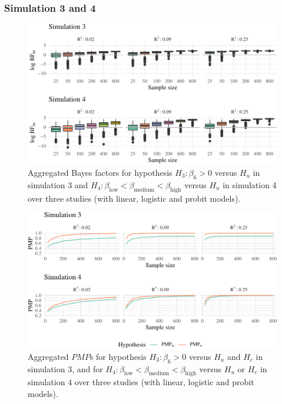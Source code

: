 \documentclass[review, 3p, authoryear]{elsarticle} %
\begin{document}
\hypertarget{simulation-3-and-4}{%
\subsubsection{Simulation 3 and 4}\label{simulation-3-and-4}}

\begin{figure}
\includegraphics[width=1\linewidth]{manuscript_volker_files/figure-latex/BF34-1} \caption{Aggregated Bayes factors for hypothesis $H_3: \beta_6 > 0$ versus $H_u$ in simulation 3 and $H_4: \beta_{\text{low}} < \beta_{\text{medium}} < \beta_{\text{high}}$ versus $H_u$ in simulation 4 over three studies (with linear, logistic and probit models).}\label{fig:BF34}
\end{figure}

\begin{figure}
\includegraphics[width=1\linewidth]{manuscript_volker_files/figure-latex/PMP34-1} \caption{Aggregated $PMP$s for hypothesis $H_3: \beta_6 > 0$ versus $H_u$ and $H_c$ in simulation 3, and for $H_4: \beta_{\text{low}} < \beta_{\text{medium}} < \beta_{\text{high}}$ versus $H_u$ or $H_c$ in simulation 4 over three studies (with linear, logistic and probit models).}\label{fig:PMP34}
\end{figure}
\end{document}
